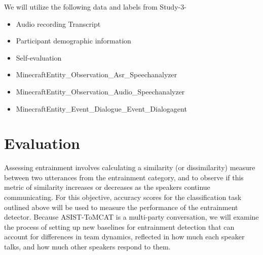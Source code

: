     We will utilize the following data and labels from Study-3-
            \begin{itemize}               
                   \item Audio recording
                    Transcript
                   \item Participant demographic information
                   \item Self-evaluation
                   \item MinecraftEntity\_Observation\_Asr\_Speechanalyzer
                   \item MinecraftEntity\_Observation\_Audio\_Speechanalyzer
                   \item MinecraftEntity\_Event\_Dialogue\_Event\_Dialogagent
            \end{itemize}

\section{Evaluation}

    Assessing entrainment involves calculating a similarity (or dissimilarity) measure between two utterances from the entrainment category, and to observe if this metric of similarity increases or decreases as the speakers continue communicating. For this objective, accuracy scores for the classification task outlined above will be used to measure the performance of the entrainment detector. Because ASIST-ToMCAT is a multi-party conversation, we will examine the process of setting up new baselines for entrainment detection that can account for differences in team dynamics, reflected in how much each speaker talks, and how much other speakers respond to them.  

